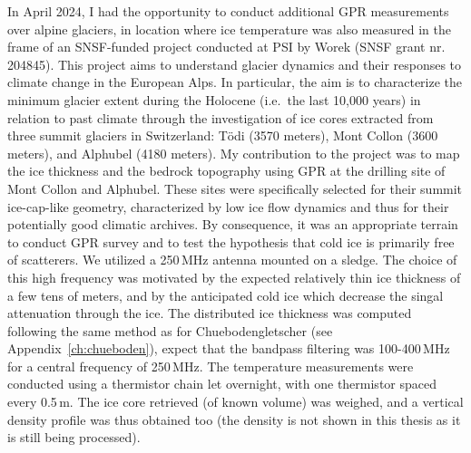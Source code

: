 In April 2024, I had the opportunity to conduct additional GPR measurements over alpine glaciers, in location where ice temperature was also measured in the frame of an SNSF-funded project conducted at PSI by Worek (SNSF grant nr. 204845). This project aims to understand glacier dynamics and their responses to climate change in the European Alps. In particular, the aim is to characterize the minimum glacier extent during the Holocene (i.e.\ the last 10,000 years) in relation to past climate through the investigation of ice cores extracted from three summit glaciers in Switzerland: Tödi (3570 meters), Mont Collon (3600 meters), and Alphubel (4180 meters). My contribution to the project was to map the ice thickness and the bedrock topography using GPR at the drilling site of Mont Collon and Alphubel. These sites were specifically selected for their summit ice-cap-like geometry, characterized by low ice flow dynamics and thus for their potentially good climatic archives. By consequence, it was an appropriate terrain to conduct GPR survey and to test the hypothesis that cold ice is primarily free of scatterers. We utilized a 250\,MHz antenna mounted on a sledge. The choice of this high frequency was motivated by the expected relatively thin ice thickness of a few tens of meters, and by the anticipated cold ice which decrease the singal attenuation through the ice. The distributed ice thickness was computed following the same method as for Chuebodengletscher (see Appendix~\ref{ch:chueboden}), expect that the bandpass filtering was 100-400\,MHz for a central frequency of 250\,MHz. The temperature measurements were conducted using a thermistor chain let overnight, with one thermistor spaced every 0.5\,m. The ice core retrieved (of known volume) was weighed, and a vertical density profile was thus obtained too (the density is not shown in this thesis as it is still being processed).


